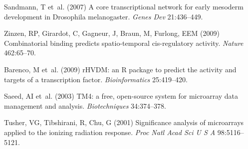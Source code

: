 \documentclass{pnastwo}
\begin{document}
\begin{article}
\begin{thebibliography}{10}
Sandmann, T et~al.
\newblock (2007) A core transcriptional network for early mesoderm development
  in {D}rosophila melanogaster.
\newblock \emph{Genes Dev} 21:436--449.

Zinzen, RP, Girardot, C, Gagneur, J, Braun, M, Furlong, EEM
\newblock (2009) Combinatorial binding predicts spatio-temporal cis-regulatory
  activity.
\newblock \emph{Nature} 462:65--70.

Barenco, M et~al.
\newblock (2009) {rHVDM}: an {R} package to predict the activity and targets of
  a transcription factor.
\newblock \emph{Bioinformatics} 25:419--420.

Saeed, AI et~al.
\newblock (2003) {TM4}: a free, open-source system for microarray data
  management and analysis.
\newblock \emph{Biotechniques} 34:374--378.

Tusher, VG, Tibshirani, R, Chu, G
\newblock (2001) Significance analysis of microarrays applied to the ionizing
  radiation response.
\newblock \emph{Proc Natl Acad Sci U S A} 98:5116--5121.

\end{thebibliography}

%
\end{article}

\end{document}
